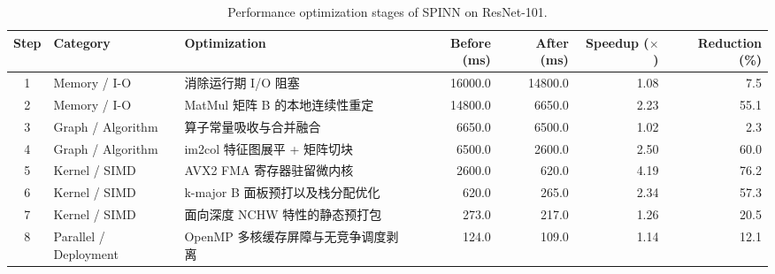 \begin{table}[htbp]
\centering
\caption{Performance optimization stages of SPINN on ResNet-101.}
\label{tab:spinn_optimization_stages}
\begin{tabular}{c l p{5.8cm} r r r r}
\toprule
Step & Category & Optimization & Before (ms) & After (ms) & Speedup ($\times$) & Reduction (\%) \\
\midrule
1 & Memory / I-O & 消除运行期 I/O 阻塞 & 16000.0 & 14800.0 & 1.08 & 7.5 \\
2 & Memory / I-O & MatMul 矩阵 B 的本地连续性重定 & 14800.0 & 6650.0 & 2.23 & 55.1 \\
3 & Graph / Algorithm & 算子常量吸收与合并融合 & 6650.0 & 6500.0 & 1.02 & 2.3 \\
4 & Graph / Algorithm & im2col 特征图展平 + 矩阵切块 & 6500.0 & 2600.0 & 2.50 & 60.0 \\
5 & Kernel / SIMD & AVX2 FMA 寄存器驻留微内核 & 2600.0 & 620.0 & 4.19 & 76.2 \\
6 & Kernel / SIMD & k-major B 面板预打以及栈分配优化 & 620.0 & 265.0 & 2.34 & 57.3 \\
7 & Kernel / SIMD & 面向深度 NCHW 特性的静态预打包 & 273.0 & 217.0 & 1.26 & 20.5 \\
8 & Parallel / Deployment & OpenMP 多核缓存屏障与无竞争调度剥离 & 124.0 & 109.0 & 1.14 & 12.1 \\
\bottomrule
\end{tabular}
\end{table}
